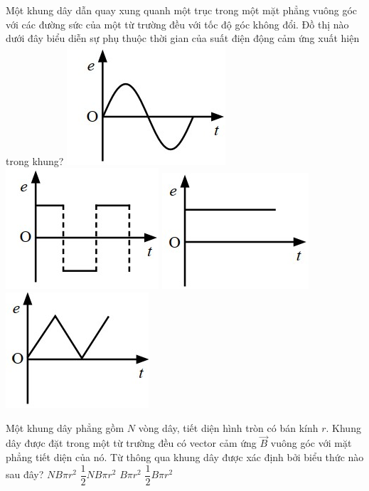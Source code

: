 \begin{ex}
	Một khung dây dẫn quay xung quanh một trục trong một mặt phẳng vuông góc với các đường sức của một từ trường đều với tốc độ góc không đổi. Đồ thị nào dưới đây biểu diễn sự phụ thuộc thời gian của suất điện động cảm ứng xuất hiện trong khung?
	\choice
	{\True \includegraphics[width=0.35\linewidth]{figs/VN12-Y24-PH-SYL-025P-7A}}
	{\includegraphics[width=0.35\linewidth]{figs/VN12-Y24-PH-SYL-025P-7B}}
	{\includegraphics[width=0.35\linewidth]{figs/VN12-Y24-PH-SYL-025P-7C}}
	{\includegraphics[width=0.35\linewidth]{figs/VN12-Y24-PH-SYL-025P-7D}}
	\loigiai{}
\end{ex}
\begin{ex}
	Một khung dây phẳng gồm $N$ vòng dây, tiết diện hình tròn có bán kính $r$. Khung dây được đặt trong một từ trường đều có vector cảm ứng $\vec{B}$ vuông góc với mặt phẳng tiết diện của nó. Từ thông qua khung dây được xác định bởi biểu thức nào sau đây?
	\choice
	{\True $N B \pi r^2$}
	{$\dfrac{1}{2} N B \pi r^2$}
	{$B \pi r^2$}
	{$\dfrac{1}{2} B \pi r^2$}
	\loigiai{}
\end{ex}
